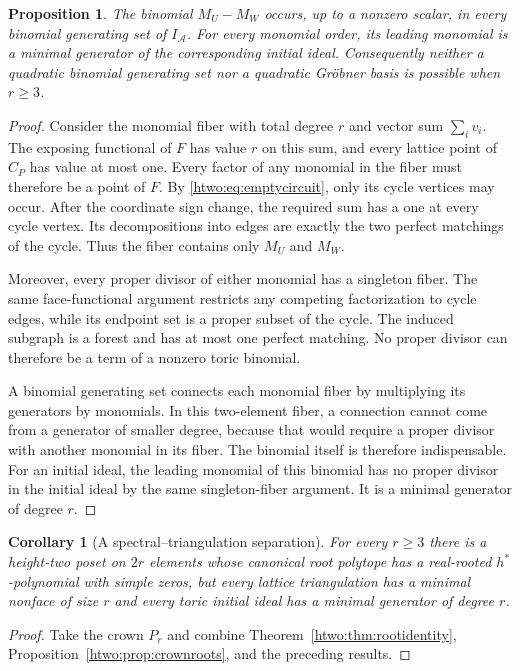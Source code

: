 \documentclass[11pt]{article}
\numberwithin{equation}{section}
\newtheorem{proposition}[theorem]{Proposition}
\newtheorem{corollary}[theorem]{Corollary}
\theoremstyle{definition}
\begin{document}
\begin{proposition}\label{htwo:prop:indispensable}
The binomial $M_U-M_W$ occurs, up to a nonzero scalar, in every binomial
generating set of $I_{\mathcal A}$. For every monomial order, its leading
monomial is a minimal generator of the corresponding initial ideal.
Consequently neither a quadratic binomial generating set nor a quadratic
Gr\"obner basis is possible when $r\ge3$.
\end{proposition}
\begin{proof}
Consider the monomial fiber with total degree $r$ and vector sum
$\sum_i v_i$. The exposing functional of $F$ has value $r$ on this
sum, and every lattice point of $C_P$ has value at most one. Every
factor of any monomial in the fiber must therefore be a point of $F$.
By \eqref{htwo:eq:emptycircuit}, only its cycle vertices may occur. After the
coordinate sign change, the required sum has a one at every cycle
vertex. Its decompositions into edges are exactly the two perfect
matchings of the cycle. Thus the fiber contains only $M_U$ and $M_W$.

Moreover, every proper divisor of either monomial has a singleton fiber.
The same face-functional argument restricts any competing factorization
to cycle edges, while its endpoint set is a proper subset of the cycle.
The induced subgraph is a forest and has at most one perfect matching.
No proper divisor can therefore be a term of a nonzero toric binomial.

A binomial generating set connects each monomial fiber by multiplying its
generators by monomials. In this two-element fiber, a connection cannot
come from a generator of smaller degree, because that would require a
proper divisor with another monomial in its fiber. The binomial itself
is therefore indispensable. For an initial ideal, the leading monomial
of this binomial has no proper divisor in the initial ideal by the same
singleton-fiber argument. It is a minimal generator of degree $r$.
\end{proof}

\begin{corollary}[A spectral--triangulation separation]
For every $r\ge3$ there is a height-two poset on $2r$ elements whose
canonical root polytope has a real-rooted $h^*$-polynomial with simple
zeros, but every lattice triangulation has a minimal nonface of size
$r$ and every toric initial ideal has a minimal generator of degree $r$.
\end{corollary}
\begin{proof}
Take the crown $P_r$ and combine Theorem~\ref{htwo:thm:rootidentity},
Proposition~\ref{htwo:prop:crownroots}, and the preceding results.
\end{proof}
\end{document}
